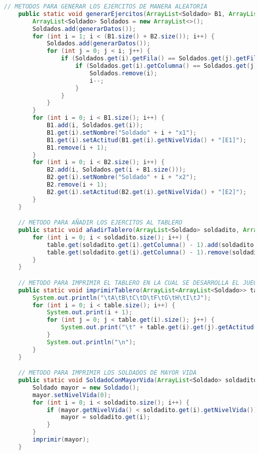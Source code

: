 \documentclass{article}
\begin{document}
\begin{itemize}
\begin{itemize}
\begin{lstlisting}[language=java]
    // METODOS PARA GENERAR LOS EJERCITOS DE MANERA ALEATORIA
    public static void generarEjercitos(ArrayList<Soldado> B1, ArrayList<Soldado> B2) {
        ArrayList<Soldado> Soldados = new ArrayList<>();
        Soldados.add(generarDatos());
        for (int i = 1; i < (B1.size() + B2.size()); i++) {
            Soldados.add(generarDatos());
            for (int j = 0; j < i; j++) {
                if (Soldados.get(i).getFila() == Soldados.get(j).getFila()) {
                    if (Soldados.get(i).getColumna() == Soldados.get(j).getColumna()) {
                        Soldados.remove(i);
                        i--;
                    }
                }
            }
        }
        for (int i = 0; i < B1.size(); i++) {
            B1.add(i, Soldados.get(i));
            B1.get(i).setNombre("Soldado" + i + "x1");
            B1.get(i).setActitud(B1.get(i).getNivelVida() + "[E1]");
            B1.remove(i + 1);
        }
        for (int i = 0; i < B2.size(); i++) {
            B2.add(i, Soldados.get(i + B1.size()));
            B2.get(i).setNombre("Soldado" + i + "x2");
            B2.remove(i + 1);
            B2.get(i).setActitud(B2.get(i).getNivelVida() + "[E2]");
        }
    }

    // METODO PARA AÑADIR LOS EJERCITOS AL TABLERO
    public static void añadirTablero(ArrayList<Soldado> soldadito, ArrayList<ArrayList<Soldado>> table) {
        for (int i = 0; i < soldadito.size(); i++) {
            table.get(soldadito.get(i).getColumna() - 1).add(soldadito.get(i).getFila() - 1, soldadito.get(i));
            table.get(soldadito.get(i).getColumna() - 1).remove(soldadito.get(i).getFila());
        }
    }

    // METODO PARA IMPRIMIR EL TABLERO EN LA CUAL SE DESARROLLA EL JUEGO
    public static void imprimirTablero(ArrayList<ArrayList<Soldado>> table) {
        System.out.println("\tA\tB\tC\tD\tF\tG\tH\tI\tJ");
        for (int i = 0; i < table.size(); i++) {
            System.out.print(i + 1);
            for (int j = 0; j < table.get(i).size(); j++) {
                System.out.print("\t" + table.get(i).get(j).getActitud());
            }
            System.out.println("\n");
        }
    }

    // METODO PARA IMPRIMIR LOS SOLDADOS DE MAYOR VIDA
    public static void SoldadoConMayorVida(ArrayList<Soldado> soldadito) {
        Soldado mayor = new Soldado();
        mayor.setNivelVida(0);
        for (int i = 0; i < soldadito.size(); i++) {
            if (mayor.getNivelVida() < soldadito.get(i).getNivelVida()) {
                mayor = soldadito.get(i);
            }
        }
        imprimir(mayor);
    }


\end{lstlisting}
\end{itemize}
\end{itemize}
\end{document}
